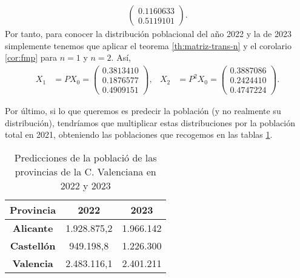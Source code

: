 \begin{ejemplo}
\begin{align*}
\begin{pmatrix}
                0.1160633 \\
                0.5119101
            \end{pmatrix}.
        \end{align*}
        Por tanto, para conocer la distribución poblacional del año 2022 y la de 2023 simplemente tenemos que aplicar el teorema \ref{th:matriz-trans-n} y el corolario \ref{cor:fmp} para $n=1$ y $n=2$. Así,
        \begin{align*}
            X_1 &= P X_0 = \begin{pmatrix}
                0.3813410 \\
                0.1876577 \\
                0.4909151
            \end{pmatrix}, & X_2 &= P^2 X_0 = \begin{pmatrix}
                0.3887086 \\
                0.2424410 \\
                0.4747224
            \end{pmatrix}.
        \end{align*}

        Por último, si lo que queremos es predecir la población (y no realmente su distribución), tendríamos que multiplicar estas distribuciones por la población total en 2021, obteniendo las poblaciones que recogemos en las tablas \ref{tab:predicciones}.

        \begin{table}[h]
            \centering
            \begin{tabular}{ccc}\hline
            \textbf{Provincia}          & \textbf{2022} & \textbf{2023} \\ \hline\hline
            \textbf{Alicante}   & 1.928.875,2   & 1.966.142     \\ \hline
            \textbf{Castellón} & 949.198,8     & 1.226.300     \\ \hline
            \textbf{Valencia}  & 2.483.116,1   & 2.401.211    \\ \hline
            \end{tabular}
            \caption{Predicciones de la població de las provincias de la C. Valenciana en 2022 y 2023}
            \label{tab:predicciones}
            \end{table}

        
\end{ejemplo}